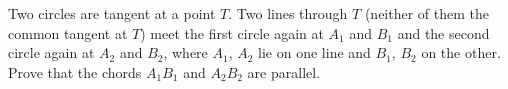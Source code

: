 Two circles are tangent at a point $T$. Two lines through $T$ (neither of them the common tangent at $T$) meet the first circle again at $A_1$ and $B_1$ and the second circle again at $A_2$ and $B_2$, where $A_1$, $A_2$ lie on one line and $B_1$, $B_2$ on the other. Prove that the chords $A_1B_1$ and $A_2B_2$ are parallel.
